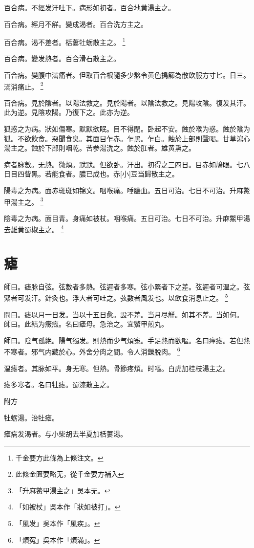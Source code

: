 \documentclass[12pt,oneside,UTF8,b5paper]{ctexbook}她她她她她她她
\begin{document}
百合病。不經发汗吐下。病形如初者。百合地黄湯主之。

百合病。經月不觧。變成渴者。百合洗方主之。

百合病。渴不差者。栝蔞牡蛎散主之。
	\footnote{千金要方此條為上條注文。}

百合病。變发熱者。百合滑石散主之。

百合病。變腹中滿痛者。但取百合根隨多少熬令黄色搗篩為散飲服方寸匕。日三。滿消痛止。
	\footnote{此條金匱要略无，從千金要方補入}

百合病。見於陰者。以陽法救之。見於陽者。以陰法救之。見陽攻陰。復发其汗。此为逆。見陰攻陽。乃復下之。此亦为逆。

狐惑之为病。狀如傷寒。默默欲眠。目不得閉。卧起不安。蝕於喉为惑。蝕於陰为狐。不欲飲食。惡聞食臭。其面目乍赤。乍黑。乍白。蝕於上部則聲喝。甘草瀉心湯主之。蝕於下部則咽乾。苦参湯洗之。蝕於肛者。雄黄熏之。

病者脉數。无熱。微煩。默默。但欲卧。汗出。初得之三四日。目赤如鳩眼。七八日目四眥黑。若能食者。膿已成也。赤[小]豆当歸散主之。

陽毒之为病。面赤斑斑如锦文。咽喉痛。唾膿血。五日可治。七日不可治。升麻鱉甲湯主之。
	\footnote{「升麻鱉甲湯主之」吳本无。}

陰毒之为病。面目青。身痛如被杖。咽喉痛。五日可治。七日不可治。升麻鱉甲湯去雄黄蜀椒主之。
	\footnote{「如被杖」吳本作「狀如被打」。}

\chapter{瘧}

師曰。瘧脉自弦。弦數者多熱。弦遲者多寒。弦小緊者下之差。弦遲者可温之。弦緊者可发汗。針灸也。浮大者可吐之。弦數者風发也。以飲食消息止之。
	\footnote{「風发」吳本作「風疾」。}

問曰。瘧以月一日发。当以十五日愈。設不差。当月尽觧。如其不差。当如何。\\
師曰。此結为癥瘕。名曰瘧母。急治之。宜鱉甲煎丸。

師曰。陰气孤絶。陽气獨发。則熱而少气煩寃。手足熱而欲嘔。名曰癉瘧。若但熱不寒者。邪气内藏於心。外舍分肉之間。令人消鑠脱肉。
	\footnote{「煩寃」吳本作「煩滿」。}

温瘧者。其脉如平。身无寒。但熱。骨節疼煩。时嘔。白虎加桂枝湯主之。

瘧多寒者。名曰牡瘧。蜀漆散主之。

附方

牡蛎湯。治牡瘧。

瘧病发渴者。与小柴胡去半夏加栝蔞湯。
\end{document}
